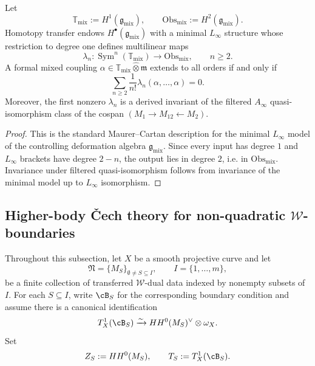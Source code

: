 \begin{theorem}
\label{thm:universal-interaction-brackets}
Let
\[
\mathbb T_{\mathrm{mix}}:=H^1(\mathfrak g_{\mathrm{mix}}),
\qquad
\mathrm{Obs}_{\mathrm{mix}}:=H^2(\mathfrak g_{\mathrm{mix}}).
\]
Homotopy transfer endows $H^\bullet(\mathfrak g_{\mathrm{mix}})$ with a minimal $L_\infty$ structure whose restriction to degree one defines multilinear maps
\[
\lambda_n : \operatorname{Sym}^n(\mathbb T_{\mathrm{mix}}) \longrightarrow \mathrm{Obs}_{\mathrm{mix}},
\qquad n\ge 2.
\]
A formal mixed coupling $\alpha\in \mathbb T_{\mathrm{mix}}\widehat\otimes \mathfrak m$ extends to all orders if and only if
\[
\sum_{n\ge 2}\frac{1}{n!}\lambda_n(\alpha,\dots,\alpha)=0.
\]
Moreover, the first nonzero $\lambda_n$ is a derived invariant of the filtered $A_\infty$ quasi-isomorphism class of the cospan $(M_1\to M_{12}\leftarrow M_2)$.
\end{theorem}

\begin{proof}
This is the standard Maurer--Cartan description for the minimal $L_\infty$ model of the controlling deformation algebra $\mathfrak g_{\mathrm{mix}}$.  Since every input has degree $1$ and $L_\infty$ brackets have degree $2-n$, the output lies in degree $2$, i.e. in $\mathrm{Obs}_{\mathrm{mix}}$.  Invariance under filtered quasi-isomorphism follows from invariance of the minimal model up to $L_\infty$ isomorphism.
\end{proof}



\subsection{Higher-body \v{C}ech theory for non-quadratic $\mathcal W$-boundaries}
\label{subsec:w-boundary-cech-theory}

\begin{convention}
\label{conv:derived-tangent-center-input}
Throughout this subsection, let $X$ be a smooth projective curve and let
\[
\mathfrak N=\{M_S\}_{\emptyset\neq S\subseteq I},\qquad I=\{1,\dots,m\},
\]
be a finite collection of transferred $\mathcal W$-dual data indexed by nonempty subsets of $I$.
For each $S\subseteq I$, write $\cB_S$ for the corresponding boundary condition and assume there is a canonical identification
\[
T^1_X(\cB_S)
\xrightarrow{\sim}
HH^0(M_S)^\vee\otimes \omega_X.
\]
Set
\[
Z_S:=HH^0(M_S),\qquad T_S:=T^1_X(\cB_S).
\]
\end{convention}

